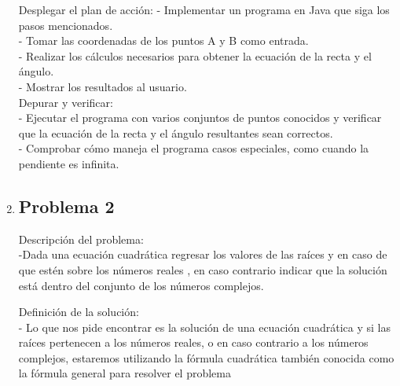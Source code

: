 \documentclass{IEEEcsmag}
\begin{document}
\begin{enumerate}
    Desplegar el plan de acción:
    - Implementar un programa en Java que siga los pasos mencionados.\\
    - Tomar las coordenadas de los puntos A y B como entrada.\\

    - Realizar los cálculos necesarios para obtener la ecuación de la recta y el ángulo. \\


   - Mostrar los resultados al usuario. \\

    Depurar y verificar: \\
    - Ejecutar el programa con varios conjuntos de puntos conocidos y verificar que la ecuación de la recta y el ángulo resultantes sean correctos. \\
    - Comprobar cómo maneja el programa casos especiales, como cuando la pendiente es infinita.

\item \subsection{Problema 2}


    Descripción del problema: \\
    -Dada una ecuación cuadrática  regresar los valores de las raíces y en caso de que estén sobre los números reales , en caso contrario indicar que la solución está dentro del conjunto de los números complejos.

    Definición de la solución: \\
    - Lo que nos pide  encontrar  es la  solución  de una ecuación cuadrática y si las raíces  pertenecen a los números reales, o  en caso contrario a los números complejos, estaremos utilizando  la fórmula cuadrática también conocida como la fórmula general para resolver el problema \\


\end{enumerate}
\end{document}
